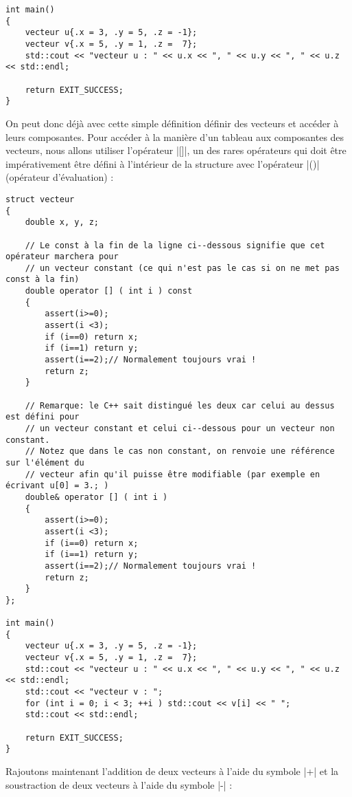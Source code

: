 \begin{itemize}
\begin{lstlisting}[caption=définition d'un vecteur en trois dimensions]
int main()
{
    vecteur u{.x = 3, .y = 5, .z = -1};
    vecteur v{.x = 5, .y = 1, .z =  7};
    std::cout << "vecteur u : " << u.x << ", " << u.y << ", " << u.z << std::endl;

    return EXIT_SUCCESS;
}
\end{lstlisting}

On peut donc déjà avec cette simple définition définir des vecteurs et accéder à leurs composantes. Pour accéder à la manière d'un tableau aux composantes des vecteurs, nous allons utiliser l'opérateur |[]|, un des rares opérateurs qui doit être impérativement être défini à l'intérieur de la structure avec l'opérateur |()| (opérateur d'évaluation) :

\begin{lstlisting}[caption=définition d'un vecteur en trois dimensions avec opérateur d'accés]
struct vecteur
{
    double x, y, z;

    // Le const à la fin de la ligne ci--dessous signifie que cet opérateur marchera pour
    // un vecteur constant (ce qui n'est pas le cas si on ne met pas const à la fin)
    double operator [] ( int i ) const
    {
        assert(i>=0);
        assert(i <3);
        if (i==0) return x;
        if (i==1) return y;
        assert(i==2);// Normalement toujours vrai !
        return z;
    }

    // Remarque: le C++ sait distingué les deux car celui au dessus est défini pour
    // un vecteur constant et celui ci--dessous pour un vecteur non constant.
    // Notez que dans le cas non constant, on renvoie une référence sur l'élément du
    // vecteur afin qu'il puisse être modifiable (par exemple en écrivant u[0] = 3.; )
    double& operator [] ( int i )
    {
        assert(i>=0);
        assert(i <3);
        if (i==0) return x;
        if (i==1) return y;
        assert(i==2);// Normalement toujours vrai !
        return z;        
    }
};

int main()
{
    vecteur u{.x = 3, .y = 5, .z = -1};
    vecteur v{.x = 5, .y = 1, .z =  7};
    std::cout << "vecteur u : " << u.x << ", " << u.y << ", " << u.z << std::endl;
    std::cout << "vecteur v : ";
    for (int i = 0; i < 3; ++i ) std::cout << v[i] << " ";
    std::cout << std::endl;

    return EXIT_SUCCESS;
}
\end{lstlisting}

Rajoutons maintenant l'addition de deux vecteurs à l'aide du symbole |+| et la soustraction de deux vecteurs
à l'aide du symbole |-| :


\end{itemize}
